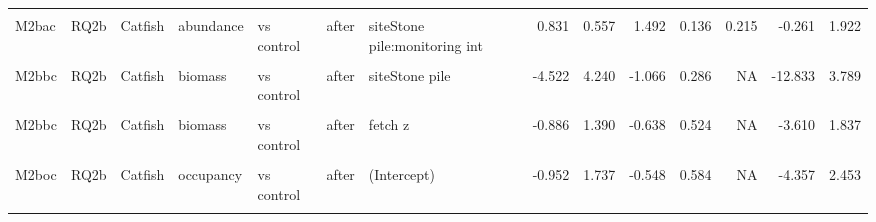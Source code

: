 \documentclass[
  12pt,
  a4paper,
  oneside]{scrbook}
\begin{document}
\begin{landscape}
\begin{longtable}[t]{lllllllrrrrrrr}
\cellcolor{gray!8}{M2bac} & \cellcolor{gray!8}{RQ2b} & \cellcolor{gray!8}{Catfish} & \cellcolor{gray!8}{abundance} & \cellcolor{gray!8}{vs control} & \cellcolor{gray!8}{after} & \cellcolor{gray!8}{fetch z} & \cellcolor{gray!8}{-1.097} & \cellcolor{gray!8}{0.976} & \cellcolor{gray!8}{-1.124} & \cellcolor{gray!8}{0.261} & \cellcolor{gray!8}{NA} & \cellcolor{gray!8}{-3.010} & \cellcolor{gray!8}{0.816}\\
\addlinespace
M2bac & RQ2b & Catfish & abundance & vs control & after & siteStone pile:monitoring int & 0.831 & 0.557 & 1.492 & 0.136 & 0.215 & -0.261 & 1.922\\
\cellcolor{gray!8}{M2bbc} & \cellcolor{gray!8}{RQ2b} & \cellcolor{gray!8}{Catfish} & \cellcolor{gray!8}{biomass} & \cellcolor{gray!8}{vs control} & \cellcolor{gray!8}{after} & \cellcolor{gray!8}{(Intercept)} & \cellcolor{gray!8}{2.964} & \cellcolor{gray!8}{2.725} & \cellcolor{gray!8}{1.088} & \cellcolor{gray!8}{0.277} & \cellcolor{gray!8}{NA} & \cellcolor{gray!8}{-2.377} & \cellcolor{gray!8}{8.304}\\
M2bbc & RQ2b & Catfish & biomass & vs control & after & siteStone pile & -4.522 & 4.240 & -1.066 & 0.286 & NA & -12.833 & 3.789\\
\cellcolor{gray!8}{M2bbc} & \cellcolor{gray!8}{RQ2b} & \cellcolor{gray!8}{Catfish} & \cellcolor{gray!8}{biomass} & \cellcolor{gray!8}{vs control} & \cellcolor{gray!8}{after} & \cellcolor{gray!8}{monitoring int} & \cellcolor{gray!8}{-0.974} & \cellcolor{gray!8}{0.688} & \cellcolor{gray!8}{-1.416} & \cellcolor{gray!8}{0.157} & \cellcolor{gray!8}{NA} & \cellcolor{gray!8}{-2.323} & \cellcolor{gray!8}{0.374}\\
M2bbc & RQ2b & Catfish & biomass & vs control & after & fetch z & -0.886 & 1.390 & -0.638 & 0.524 & NA & -3.610 & 1.837\\
\addlinespace
\cellcolor{gray!8}{M2bbc} & \cellcolor{gray!8}{RQ2b} & \cellcolor{gray!8}{Catfish} & \cellcolor{gray!8}{biomass} & \cellcolor{gray!8}{vs control} & \cellcolor{gray!8}{after} & \cellcolor{gray!8}{siteStone pile:monitoring int} & \cellcolor{gray!8}{1.357} & \cellcolor{gray!8}{0.974} & \cellcolor{gray!8}{1.393} & \cellcolor{gray!8}{0.164} & \cellcolor{gray!8}{0.215} & \cellcolor{gray!8}{-0.552} & \cellcolor{gray!8}{3.266}\\
M2boc & RQ2b & Catfish & occupancy & vs control & after & (Intercept) & -0.952 & 1.737 & -0.548 & 0.584 & NA & -4.357 & 2.453\\
\cellcolor{gray!8}{M2boc} & \cellcolor{gray!8}{RQ2b} & \cellcolor{gray!8}{Catfish} & \cellcolor{gray!8}{occupancy} & \cellcolor{gray!8}{vs control} & \cellcolor{gray!8}{after} & \cellcolor{gray!8}{siteStone pile} & \cellcolor{gray!8}{-2.013} & \cellcolor{gray!8}{1.936} & \cellcolor{gray!8}{-1.040} & \cellcolor{gray!8}{0.298} & \cellcolor{gray!8}{NA} & \cellcolor{gray!8}{-5.808} & \cellcolor{gray!8}{1.781}\\

\end{longtable}
\end{landscape}
\end{document}
